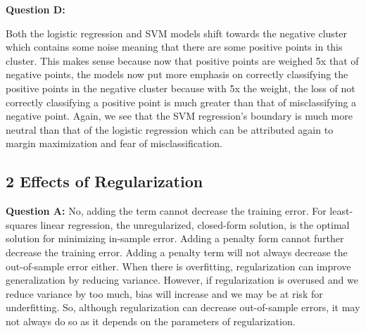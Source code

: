\documentclass[12 pt]{article}
\begin{document}
	\noindent\textbf{Question D:}  
		\begin{figure}[H]
			\centering
		\end{figure}
	\noindent Both the logistic regression and SVM models shift towards the negative cluster which contains some noise meaning that there are some positive points in this cluster. This makes sense because now that positive points are weighed 5x that of negative points, the models now put more emphasis on correctly classifying the positive points in the negative cluster because with 5x the weight, the loss of not correctly classifying a positive point is much greater than that of misclassifying a negative point. Again, we see that the SVM regression's boundary is much more neutral than that of the logistic regression which can be attributed again to margin maximization and fear of misclassification.\\ 
 
	
	\subsection*{2 Effects of Regularization}
	\noindent\textbf{Question A:} No, adding the term cannot decrease the training error. For least-squares linear regression, the unregularized, closed-form solution, is the optimal solution for minimizing in-sample error. Adding a penalty form cannot further decrease the training error. Adding a penalty term will not always decrease the out-of-sample error either. When there is overfitting, regularization can improve generalization by reducing variance. However, if regularization is overused and we reduce variance by too much, bias will increase and we may be at risk for underfitting. So, although regularization can decrease out-of-sample errors, it may not always do so as it depends on the parameters of regularization. \\
	
\end{document}
